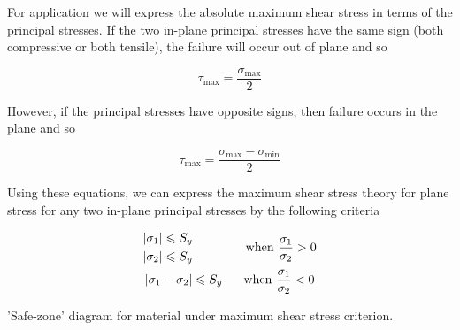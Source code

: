 \documentclass[
10pt,
a4paper,
openany,
svgnames,
]{kaobook} %
\begin{document}
For application we will express the absolute maximum shear stress in terms of the principal stresses. If the two in-plane principal stresses have the same sign (both compressive or both tensile), the failure will occur out of plane and so

\begin{equation}
  \tau _{\max } = \frac{\sigma _{\max }}{2}
\end{equation}

However, if the principal stresses have opposite signs, then failure occurs in the plane and so

\begin{equation}
  \tau _{\max } = \frac{\sigma_{\max } - \sigma _{\min }}{2}
\end{equation}

Using these equations, we can express the maximum shear stress theory for plane stress for any two in-plane principal stresses by the following criteria

\begin{equation}
  \begin{gathered}
    \begin{gathered}
      \left| \sigma_1 \right| \leqslant S_y \hfill \\
      \left| \sigma_2 \right| \leqslant S_y \hfill \\ 
    \end{gathered}  \hspace{1.5cm} \text{when } \dfrac{\sigma _1}{\sigma _2} > 0  \\
    \left| \sigma _1 - \sigma _2 \right| \leqslant S_y \hspace{0.6cm} \text{when } \dfrac{\sigma _1}{\sigma _2} < 0 \\ 
  \end{gathered}
\end{equation}

\begin{marginfigure}
  \centering
  \caption{'Safe-zone' diagram for material under maximum shear stress criterion.}
  \label{fig: MSST safe zone}
\end{marginfigure}
\end{document}
